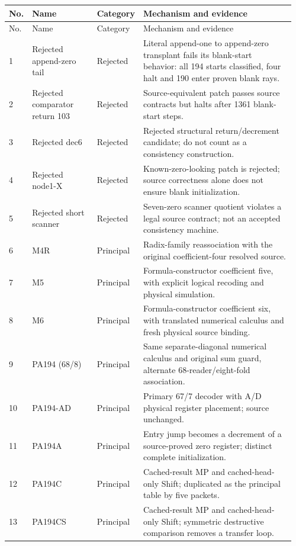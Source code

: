 \begingroup
\fontsize{9}{10.2}\selectfont\raggedright\setlength{\tabcolsep}{3pt}
\begin{longtable}{@{}p{0.035\linewidth}p{0.235\linewidth}p{0.135\linewidth}p{0.55\linewidth}@{}}
\toprule
No. & Name & Category & Mechanism and evidence\\\midrule\endfirsthead
\toprule
No. & Name & Category & Mechanism and evidence\\\midrule\endhead
1 & Rejected append-zero tail & Rejected & Literal append-one to append-zero transplant fails its blank-start behavior: all 194 starts classified, four halt and 190 enter proven blank rays.\\[4pt]
2 & Rejected comparator return 103 & Rejected & Source-equivalent patch passes source contracts but halts after 1361 blank-start steps.\\[4pt]
3 & Rejected dec6 & Rejected & Rejected structural return/decrement candidate; do not count as a consistency construction.\\[4pt]
4 & Rejected node1-X & Rejected & Known-zero-looking patch is rejected; source correctness alone does not ensure blank initialization.\\[4pt]
5 & Rejected short scanner & Rejected & Seven-zero scanner quotient violates a legal source contract; not an accepted consistency machine.\\[4pt]
6 & M4R & Principal & Radix-family reassociation with the original coefficient-four resolved source.\\[4pt]
7 & M5 & Principal & Formula-constructor coefficient five, with explicit logical recoding and physical simulation.\\[4pt]
8 & M6 & Principal & Formula-constructor coefficient six, with translated numerical calculus and fresh physical source binding.\\[4pt]
9 & PA194 (68/8) & Principal & Same separate-diagonal numerical calculus and original sum guard, alternate 68-reader/eight-fold association.\\[4pt]
10 & PA194-AD & Principal & Primary 67/7 decoder with A/D physical register placement; source unchanged.\\[4pt]
11 & PA194A & Principal & Entry jump becomes a decrement of a source-proved zero register; distinct complete initialization.\\[4pt]
12 & PA194C & Principal & Cached-result MP and cached-head-only Shift; duplicated as the principal table by five packets.\\[4pt]
13 & PA194CS & Principal & Cached-result MP and cached-head-only Shift; symmetric destructive comparison removes a transfer loop.\\[4pt]

\end{longtable}
